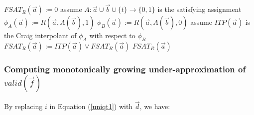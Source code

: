 \documentclass[runningheads,a4paper,orivec]{llncs}
\begin{document}
% 

\begin{algorithm}[t]
\SetAlgoVlined
{}
$FSAT_R(\vec{a}):= 0$ \;
 {
  assume $A:\vec{a}\cup\vec{b}\cup\{t\}\rightarrow \{0,1\}$ is the satisfying assignment \;
  $\phi_A(\vec{a}):= R(\vec{a},A(\vec{b}),1)$ \;
  $\phi_B(\vec{a}):= R(\vec{a},A(\vec{b}),0)$ \;
  assume $ITP(\vec{a})$ is the Craig interpolant of $\phi_A$ with respect to $\phi_B$ \;
  $FSAT_R(\vec{a}):= ITP(\vec{a}) \vee FSAT_R(\vec{a})$ \;
}
\KwRet $FSAT_R(\vec{a})$
\caption{$CharacterizingFormulaSAT(R,\vec{a},\vec{b},t)$
}
\label{alg_craigchar}
\end{algorithm}

\subsubsection{Computing monotonically growing under-approximation of $valid(\vec{f})$}\label{subsub_nonloop}
By replacing $i$ in Equation (\ref{uniqt1}) with $\vec{d}$,
we have:
\end{document}
